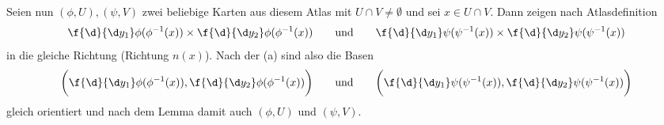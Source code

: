 \documentclass[a4paper]{scrartcl}
\begin{document}
\begin{aufgabe}
\begin{enumerate}[(a)]
\begin{seg}[„$\Longleftarrow$“]
				Seien nun $(\phi, U), (\psi, V)$ zwei beliebige Karten aus diesem Atlas mit $U\cap V \neq \emptyset$ und sei $x\in U\cap V$.
				Dann zeigen nach Atlasdefinition
				\[
					\f{\d}{\d y_1}\phi(\phi^{-1}(x)) \times \f{\d}{\d y_2} \phi(\phi^{-1}(x))
					\qquad\text{und}\qquad
					\f{\d}{\d y_1}\psi(\psi^{-1}(x)) \times \f{\d}{\d y_2} \psi(\psi^{-1}(x))
				\]
				in die gleiche Richtung (Richtung $n(x)$).
				Nach der (a) sind also die Basen
				\[
					\bigg( \f{\d}{\d y_1} \phi(\phi^{-1}(x)), \f{\d}{\d y_2} \phi(\phi^{-1}(x)) \bigg)
					\qquad \text{und}\qquad
					\bigg( \f{\d}{\d y_1} \psi(\psi^{-1}(x)), \f{\d}{\d y_2} \psi(\psi^{-1}(x)) \bigg)
				\]
				gleich orientiert und nach dem Lemma damit auch $(\phi, U)$ und $(\psi, V)$.
			\end{seg}
	\end{enumerate}
\end{aufgabe}
\end{document}

